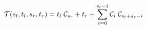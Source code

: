 \begin{equation}  \label{fun:tid}
  {\cal T}(s_l, t_l, s_r, t_r) = t_l \; {\cal C}_{s_r} + t_r +
  \sum_{i = 0}^{s_l - 1} {\cal C}_i \; {\cal C}_{s_l + s_r - i}
\end{equation}
